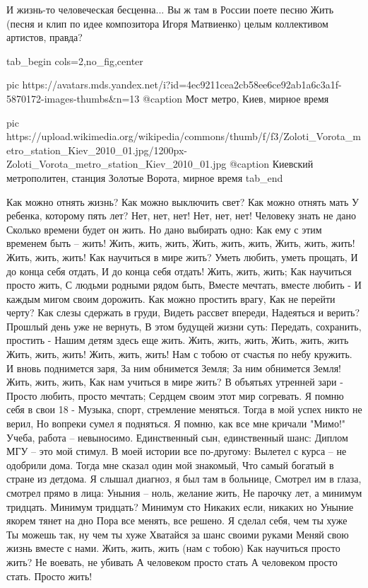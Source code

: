 И жизнь-то человеческая бесценна... Вы ж там в России поете песню Жить (песня и
клип по идее композитора Игоря Матвиенко) целым коллективом артистов, правда?

\ifcmt
  tab_begin cols=2,no_fig,center

     pic https://avatars.mds.yandex.net/i?id=4ec9211cea2cb58ee6ce92ab1a6c3a1f-5870172-images-thumbs&n=13
		 @caption Мост метро, Киев, мирное время

		 pic https://upload.wikimedia.org/wikipedia/commons/thumb/f/f3/Zoloti_Vorota_metro_station_Kiev_2010_01.jpg/1200px-Zoloti_Vorota_metro_station_Kiev_2010_01.jpg
		 @caption Киевский метрополитен, станция Золотые Ворота, мирное время
  tab_end
\fi

\raggedcolumns
\begin{multicols}{2} %
\setlength{\parindent}{0pt}

\obeycr
Как можно отнять жизнь?
Как можно выключить свет?
Как можно отнять мать
У ребенка, которому пять лет?
\smallskip
Нет, нет, нет!
Нет, нет, нет!
\smallskip
Человеку знать не дано
Сколько времени будет он жить.
Но дано выбирать одно:
Как ему с этим временем быть – жить!
\smallskip
Жить, жить, жить,
Жить, жить, жить,
Жить, жить, жить!
Жить, жить, жить!
\smallskip
Как научиться в мире жить?
Уметь любить, уметь прощать,
И до конца себя отдать,
И до конца себя отдать!
\smallskip
Жить, жить, жить;
Как научиться просто жить,
С людьми родными рядом быть,
Вместе мечтать, вместе любить -
И каждым мигом своим дорожить.
\smallskip
Как можно простить врагу,
Как не перейти черту?
Как слезы сдержать в груди,
Видеть рассвет впереди,
Надеяться и верить?
\smallskip
Прошлый день уже не вернуть,
В этом будущей жизни суть:
Передать, сохранить, простить -
Нашим детям здесь еще жить.
\smallskip
Жить, жить, жить,
Жить, жить, жить
Жить, жить, жить!
Жить, жить, жить!
\smallskip
Нам с тобою от счастья по небу кружить.
И вновь поднимется заря,
За ним обнимется Земля;
За ним обнимется Земля!
\smallskip
Жить, жить, жить,
Как нам учиться в мире жить?
В объятьях утренней зари -
Просто любить, просто мечтать;
Сердцем своим этот мир согревать.
\smallskip
Я помню себя в свои 18 -
Музыка, спорт, стремление меняться.
Тогда в мой успех никто не верил,
Но вопреки сумел я подняться.
\smallskip
Я помню, как все мне кричали "Мимо!"
Учеба, работа – невыносимо.
Единственный сын, единственный шанс:
Диплом МГУ – это мой стимул.
\smallskip
В моей истории все по-другому:
Вылетел с курса – не одобрили дома.
Тогда мне сказал один мой знакомый,
Что самый богатый в стране из детдома.
\smallskip
Я слышал диагноз, я был там в больнице,
Смотрел им в глаза, смотрел прямо в лица:
Уныния – ноль, желание жить,
Не парочку лет, а минимум тридцать.
\smallskip
Минимум тридцать? Минимум сто
Никаких если, никаких но
Уныние якорем тянет на дно
Пора все менять, все решено.
\smallskip
Я сделал себя, чем ты хуже
Ты можешь так, ну чем ты хуже
Хватайся за шанс своими руками
Меняй свою жизнь вместе с нами.
\smallskip
Жить, жить, жить (нам с тобою)
Как научиться просто жить?
\smallskip
Не воевать, не убивать
А человеком просто стать
А человеком просто стать.
\smallskip
Просто жить!
\restorecr
\end{multicols} %


